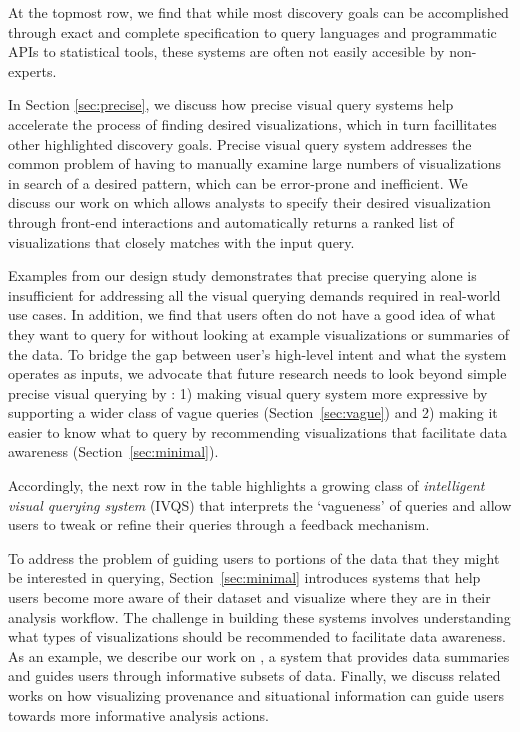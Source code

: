  At the topmost row, we find that while most discovery goals can be accomplished through exact and complete specification to query languages and programmatic APIs to statistical tools, these systems are often not easily accesible by non-experts.
\par In Section \ref{sec:precise}, we discuss how precise visual query systems help accelerate the process of finding desired visualizations, which in turn facillitates other highlighted discovery goals. Precise visual query system addresses the common problem of having to manually examine large numbers of visualizations in search of a desired pattern, which can be error-prone and inefficient. We discuss our work on \zv which allows analysts to specify their desired visualization through front-end interactions and automatically returns a ranked list of visualizations that closely matches with the input query.
\par Examples from our \zv design study demonstrates that precise querying alone is insufficient for addressing all the visual querying demands required in real-world use cases. In addition, we find that users often do not have a good idea of what they want to query for without looking at example visualizations or summaries of the data. To bridge the gap between user's high-level intent and what the system operates as inputs, we advocate that future research needs to look beyond simple precise visual querying by : 1) making visual query system more expressive by supporting a wider class of vague queries (Section~\ref{sec:vague}) and 2) making it easier to know what to query by recommending visualizations that facilitate data awareness (Section~\ref{sec:minimal}).
\par Accordingly, the next row in the table highlights a growing class of \textit{intelligent visual querying system} (IVQS) that interprets the `vagueness' of queries and allow users to tweak or refine their queries through a feedback mechanism.  
\par To address the problem of guiding users to portions of the data that they might be interested in querying, Section~\ref{sec:minimal} introduces systems that help users become more aware of their dataset and visualize where they are in their analysis workflow. The challenge in building these systems involves understanding what types of visualizations should be recommended to facilitate data awareness. As an example, we describe our work on \sbd, a system that provides data summaries and guides users through informative subsets of data. Finally, we discuss related works on how visualizing provenance and situational information can guide users towards more informative analysis actions.
